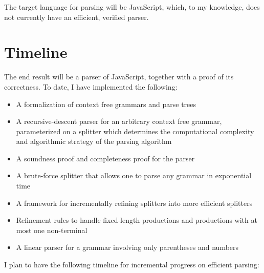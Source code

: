 \documentclass{article}
\begin{document}
  The target language for parsing will be JavaScript, which, to my knowledge, does not currently have an efficient, verified parser.   %
  
  
\section{Timeline}
  The end result will be a parser of JavaScript, together with a proof of its correctness.  To date, I have implemented the following:
  \begin{itemize}
    \item A formalization of context free grammars and parse trees
    \item A recursive-descent parser for an arbitrary context free grammar, parameterized on a splitter which determines the computational complexity and algorithmic strategy of the parsing algorithm
    \item A soundness proof and completeness proof for the parser
    \item A brute-force splitter that allows one to parse any grammar in exponential time
    \item A framework for incrementally refining splitters into more efficient splitters
    \item Refinement rules to handle fixed-length productions and productions with at most one non-terminal
    \item A linear parser for a grammar involving only parentheses and numbers
  \end{itemize}
  
  I plan to have the following timeline for incremental progress on efficient parsing:
  
\end{document}
